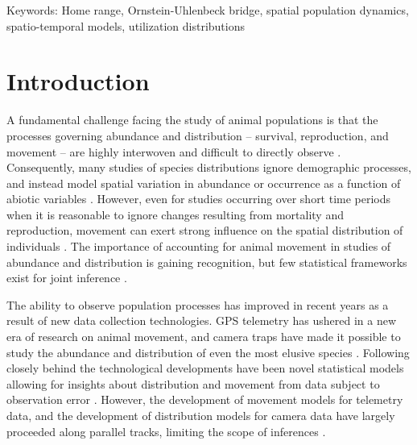 \documentclass[12pt]{article}
\begin{document}
  
\noindent
Keywords: Home range, Ornstein-Uhlenbeck bridge, spatial population
dynamics, spatio-temporal models, utilization distributions



\clearpage

\section{Introduction}

A fundamental challenge facing the study of animal populations is
that the processes governing abundance and distribution -- 
survival, reproduction, and movement -- are highly interwoven and
difficult to directly observe
\citep{williams_etal:2002,royle_dorazio:2008}. Consequently, many
studies of species distributions ignore demographic processes, and
instead model spatial variation in abundance or occurrence as a
function of abiotic variables \citep{elith_etal:2006}. However, even
for studies occurring over short time periods when it is reasonable
to ignore changes resulting from mortality and reproduction, movement
can exert strong influence on the spatial distribution of individuals
\citep{jouventin_weimerskirch:1990,andrew_fox:2020}.
The importance of accounting for animal movement in studies of
abundance and distribution is gaining recognition, but few statistical
frameworks exist for joint inference
\citep{morales_etal:2010,matthiopoulos_etal:2015,spiegel_etal:2017}. 

The ability to observe population processes has improved in
recent years as a result of new data collection technologies. 
GPS telemetry has ushered in a new era of research
on animal movement, and camera traps have made it possible to 
study the abundance and distribution of even the most elusive species
\citep{cagnacci_etal:2010,oconnell_etal:2010}. Following closely
behind the technological developments have been novel statistical
models allowing for insights about distribution and movement from data
subject to observation error
\citep{royle_etal:2014,hooten_etal:2017}. 
However, the development of movement models for telemetry data, and
the development of distribution models for camera data
have largely proceeded along parallel tracks, limiting the scope of
inferences \citep{mcclintock_etal:2021}. 
\end{document}
